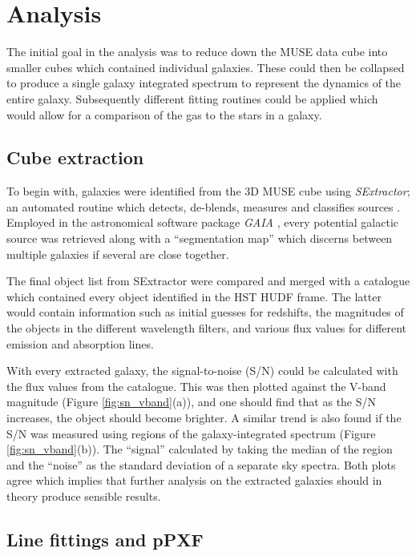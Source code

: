 \documentclass[12pt, twocolumn]{revtex4}    %
\begin{document}
\section{Analysis} 
\label{sec:analysis}

The initial goal in the analysis was to reduce down the MUSE data cube into smaller cubes which contained individual galaxies. These could then be collapsed to produce a single galaxy integrated spectrum to represent the dynamics of the entire galaxy. Subsequently different fitting routines could be applied which would allow for a comparison of the gas to the stars in a galaxy.

\subsection{Cube extraction}

To begin with, galaxies were identified from the 3D MUSE cube using \textit{SExtractor}; an automated routine which detects, de-blends, measures and classifies sources \citep{bertin_sextractor}. Employed in the astronomical software package \textit{GAIA} \citep{currie_starlink}, every potential galactic source was retrieved along with a ``segmentation map'' which discerns between multiple galaxies if several are close together. 

The final object list from SExtractor were compared and merged with a catalogue which contained every object identified in the HST HUDF frame. The latter would contain information such as initial guesses for redshifts, the magnitudes of the objects in the different wavelength filters, and various flux values for different emission and absorption lines.


With every extracted galaxy, the signal-to-noise (S/N) could be calculated with the flux values from the catalogue. This was then plotted against the V-band magnitude (Figure \ref{fig:sn_vband}(a)), and one should find that as the S/N increases, the object should become brighter. A similar trend is also found if the S/N was measured using regions of the galaxy-integrated spectrum (Figure \ref{fig:sn_vband}(b)). The ``signal'' calculated by taking the median of the region and the ``noise'' as the standard deviation of a separate sky spectra. Both plots agree which implies that further analysis on the extracted galaxies should in theory produce sensible results. 

\subsection{Line fittings and pPXF} 
\end{document}
